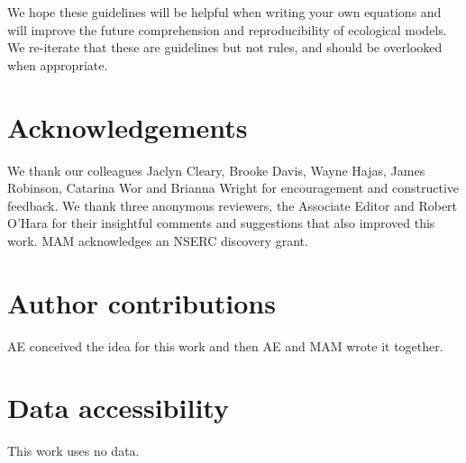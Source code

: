 \documentclass[12pt]{article}
\begin{document}
We hope these guidelines will be helpful when writing your own equations and 
will improve the future comprehension and reproducibility of ecological models.
We re-iterate that
these are guidelines but not rules, and should be overlooked when appropriate.

\section*{Acknowledgements} 

We thank our colleagues
Jaclyn Cleary,
Brooke Davis,
Wayne Hajas,
James Robinson,
Catarina Wor
and Brianna Wright
for encouragement and constructive feedback.
We thank three anonymous reviewers, the Associate Editor and Robert O'Hara
for their insightful comments and suggestions that also improved this work.
MAM acknowledges an NSERC discovery grant.

\section*{Author contributions} AE conceived the idea for this work
and then AE and MAM wrote it together.

\section*{Data accessibility}

This work uses no data.



\clearpage

\thispagestyle{empty}



\end{document}
